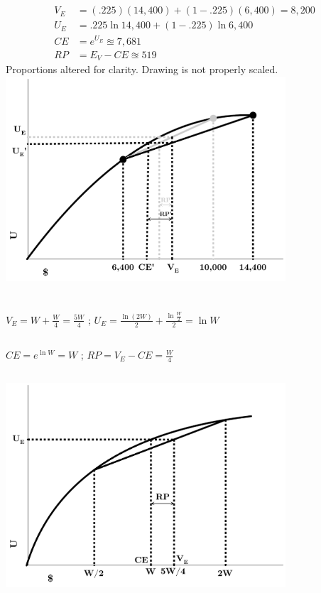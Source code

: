 \documentclass{article}
\begin{document}
	\subsection[c]{}
		\begin{align*}
			V_E &= (.225)(14,400)+(1-.225)(6,400) = 8,200\\
			U_E &= .225 \ln 14,400 + (1-.225) \ln 6,400 \\
			CE &= e^{U_E} \approxeq 7,681 \\
			RP &= E_V - CE \approxeq 519
		\end{align*}
		Proportions altered for clarity. Drawing is not properly scaled.  \\
		\includegraphics[height=3in]{Charts/3c}
		
\section[4]{}
	\subsection[a]{}
		$ V_E = W + \frac{W}{4} = \frac{5W}{4} $ ; $ U_E = \frac{\ln (2W)}{2} + \frac{\ln \frac{W}{2}}{2} = \ln W $
	\subsection[b]{}
		$ CE = e^{\ln W} = W $ ; $ RP = V_E - CE = \frac{W}{4} $
	\subsection[c]{}
		\includegraphics[height=3in]{Charts/4c}
\end{document}
